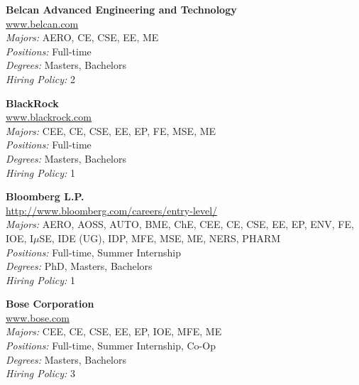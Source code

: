 \documentclass[twoside]{article}
\begin{document}
\begin{center}
\begin{multicols}{3}
\begin{minipage}{.9\columnwidth}{\Large\bf Belcan Advanced Engineering and Technology }\\
	\url{www.belcan.com}\\
	\emph{Majors:} AERO, CE, CSE, EE, ME\\
	\emph{Positions:} Full-time\\
	\emph{Degrees:} Masters, Bachelors\\
	\emph{Hiring Policy:} 2\\
\end{minipage}
 
\begin{minipage}{.9\columnwidth}{\Large\bf BlackRock }\\
	\url{www.blackrock.com}\\
	\emph{Majors:} CEE, CE, CSE, EE, EP, FE, MSE, ME\\
	\emph{Positions:} Full-time\\
	\emph{Degrees:} Masters, Bachelors\\
	\emph{Hiring Policy:} 1\\
\end{minipage}
 
\begin{minipage}{.9\columnwidth}{\Large\bf Bloomberg L.P. }\\
	\url{http://www.bloomberg.com/careers/entry-level/}\\
	\emph{Majors:} AERO, AOSS, AUTO, BME, ChE, CEE, CE, CSE, EE, EP, ENV, FE, IOE, I$\mu$SE, IDE (UG), IDP, MFE, MSE, ME, NERS, PHARM\\
	\emph{Positions:} Full-time, Summer Internship\\
	\emph{Degrees:} PhD, Masters, Bachelors\\
	\emph{Hiring Policy:} 1\\
\end{minipage}
 
\begin{minipage}{.9\columnwidth}{\Large\bf Bose Corporation }\\
	\url{www.bose.com}\\
	\emph{Majors:} CEE, CE, CSE, EE, EP, IOE, MFE, ME\\
	\emph{Positions:} Full-time, Summer Internship, Co-Op\\
	\emph{Degrees:} Masters, Bachelors\\
	\emph{Hiring Policy:} 3\\
\end{minipage}
 

\end{multicols}
\end{center}
\end{document}
